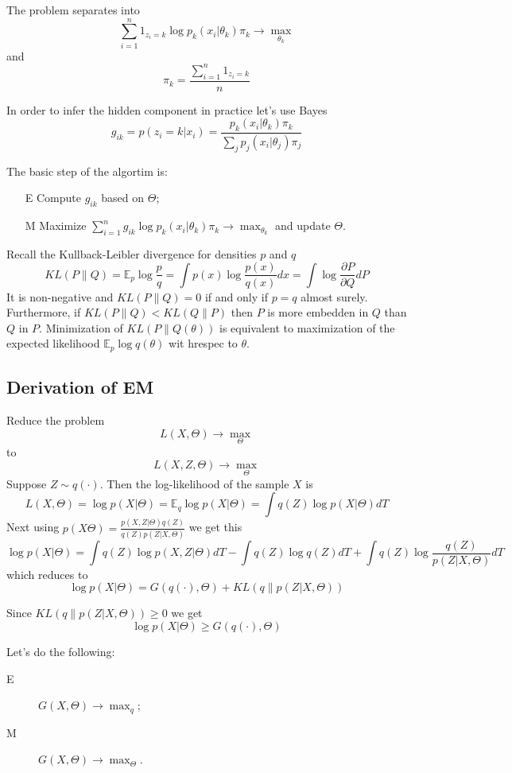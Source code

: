 \documentclass[a4paper]{article}
\newcommand{\ex}{\mathbb{E}}
\begin{document}
The problem separates into
\[ \sum_{i=1}^n 1_{z_i=k} \log p_k(x_i|\theta_k) \pi_k \to \max_{\theta_k} \]
and 
\[ \pi_k = \frac{\sum_{i=1}^n 1_{z_i=k}}{n} \]

In order to infer the hidden component in practice let's use Bayes
\[
g_{ik}
= p(z_i = k| x_i)
= \frac{ p_k(x_i|\theta_k) \pi_k }{\sum_j p_j(x_i|\theta_j) \pi_j}
\]

The basic step of the algortim is:
\begin{itemize}
	\item[E] Compute $g_{ik}$ based on $\Theta$;
	\item[M] Maximize $\sum_{i=1}^n g_{ik} \log p_k(x_i|\theta_k) \pi_k \to \max_{\theta_k}$
	and update $\Theta$.
\end{itemize}

Recall the Kullback-Leibler divergence for densities $p$ and $q$
\[
KL(P\|Q)
= \ex_p \log \frac{p}{q}
= \int p(x) \log \frac{p(x)}{q(x)} dx
= \int \log \frac{\partial P}{\partial Q} dP
\]
It is non-negative and $KL(P\|Q) = 0$ if and only if $p = q$ almost surely.
Furthermore, if $KL(P\|Q)< KL(Q\|P)$ then $P$ is more embedden in $Q$ than $Q$ in $P$.
Minimization of $KL(P\|Q(\theta))$ is equivalent to maximization of the expected
likelihood $\ex_p \log q(\theta)$ wit hrespec to $\theta$.


\subsection{Derivation of EM} %
\label{sub:derivation_of_em}

Reduce the problem 
\[L(X,\Theta) \to \max_\Theta\]
to
\[L(X,Z,\Theta) \to \max_\Theta\]
Suppose $Z\sim q(\cdot)$. Then the log-likelihood of the sample $X$ is
\[
L(X,\Theta)
= \log p(X|\Theta)
= \ex_q \log p(X|\Theta)
= \int q(Z) \log p(X|\Theta) dT
\]
Next using $p(X \Theta) = \frac{p(X,Z|\Theta) q(Z)}{ q(Z) p(Z|X,\Theta)}$ we get this
\[
\log p(X|\Theta)
= \int q(Z) \log p(X,Z|\Theta) dT - \int q(Z) \log q(Z) dT
+ \int q(Z) \log \frac{q(Z)}{p(Z|X,\Theta)} dT
\]
which reduces to
\[ \log p(X|\Theta) = G(q(\cdot),\Theta) + KL(q\|p(Z|X,\Theta)) \]

Since $KL(q\|p(Z|X,\Theta)) \geq 0$ we get
\[
\log p(X|\Theta) \geq G(q(\cdot),\Theta)
\]

Let's do the following: \begin{description}
	\item[E] $G(X,\Theta) \to \max_q$;
	\item[M] $G(X,\Theta) \to \max_{\Theta}$.
\end{description}
\end{document}
